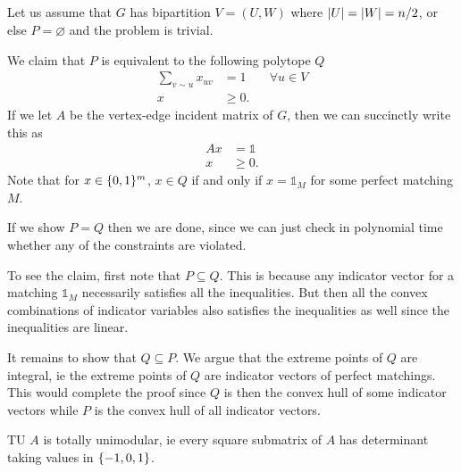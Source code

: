\documentclass[10pt]{article}
\DeclarePairedDelimiter{\set}{\lbrace}{\rbrace}
\DeclarePairedDelimiter{\card}{\lvert}{\rvert}
\newcommand{\ones}{\mathds{1}}
\newcommand{\sset}{\subseteq}
\begin{document}
\subsection{}
Let us assume that $G$ has bipartition $V=(U, W)$
where $\card U = \card W = n/2$,
or else $P = \varnothing$ and the problem is trivial.

We claim that $P$ is equivalent to the following polytope $Q$
\begin{align*}
  \sum_{v\sim u} x_{uv} &= 1 &&\forall u\in V \\
  x &\geq 0.
\end{align*}
If we let $A$ be the vertex-edge incident matrix of $G$,
then we can succinctly write this as
\begin{align*}
  Ax &= \ones \\
  x &\geq 0.
\end{align*}
Note that for $x\in \set{0, 1}^m$,
$x\in Q$ if and only if $x = \ones_M$ for some perfect matching $M$.

If we show $P=Q$ then we are done,
since we can just check in polynomial time whether any of the constraints are violated.

To see the claim,
first note that $P\sset Q$.
This is because any indicator vector for a matching $\ones_M$
necessarily satisfies all the inequalities.
But then all the convex combinations of indicator variables
also satisfies the inequalities as well since the inequalities are linear.

It remains to show that $Q\sset P$.
We argue that the extreme points of $Q$ are integral,
ie the extreme points of $Q$ are indicator vectors of perfect matchings.
This would complete the proof
since $Q$ is then the convex hull of some indicator vectors
while $P$ is the convex hull of all indicator vectors.

\begin{lem}{}{TU}
  $A$ is totally unimodular,
  ie every square submatrix of $A$ has determinant taking values in $\set{-1, 0, 1}$.
\end{lem}
\end{document}
